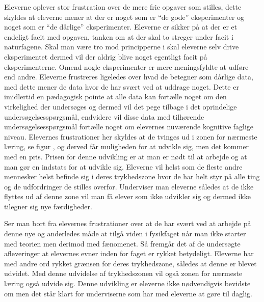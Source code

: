 Eleverne oplever stor frustration over de mere frie opgaver som stilles, dette skyldes at eleverne mener at der er noget som er ``de gode'' eksperimenter og noget som er ``de dårlige'' eksperimenter. Eleverne er sikker på at der er et endeligt facit med opgaven, tanken om at der skal to streger under facit i naturfagene. Skal man være tro mod principperne i \ib{} skal eleverne selv drive eksperimentet dermed vil der aldrig blive noget egentligt facit på eksperimenterne. Omend nogle eksperimenter er mere meningsfyldte at udføre end andre. Eleverne frustreres ligeledes over hvad de betegner som dårlige data, med dette mener de data hvor de har svært ved at uddrage noget. Dette er imidlertid en pædagogisk pointe at alle data kan fortælle noget om den virkelighed der undersøges og dermed vil det pege tilbage i det oprindelige undersøgelsesspørgsmål, endvidere vil disse data med tilhørende undersøgelsesspørgsmål fortælle noget om elevernes nuværende kognitive faglige niveau.  Elevernes frustrationer her skyldes at de tvinges ud i zonen for nærmeste læring, se figur , og derved får muligheden for at udvikle sig, men det kommer med en pris. Prisen for denne udvikling er at man er nødt til at arbejde og at man gør en indstats for at udvikle sig. Eleverne vil helst som de fleste andre mennesker helst befinde sig i deres trykhedszone hvor de har helt styr på alle ting og de udfordringer de stilles overfor. Underviser man eleverne således at de ikke flyttes ud af denne zone vil man få elever som ikke udvikler sig og dermed ikke tilegner sig nye færdigheder. 

Ser man bort fra elevernes frustrationer over at de har svært ved at arbejde på denne nye og anderledes måde at tilgå viden i fysikfaget når man ikke starter med teorien men derimod med fænomenet. Så fremgår det af de undersøgte afleveringer at elevernes evner inden for faget er rykket betydeligt. Eleverne har med andre ord rykket grænsen for deres trykhedszone, således at denne er blevet udvidet. Med denne udvidelse af trykhedszonen vil også zonen for nærmeste læring også udvide sig. Denne udvikling er eleverne ikke nødvendigvis bevidste om men det står klart for underviserne som har med eleverne at gøre til daglig.

